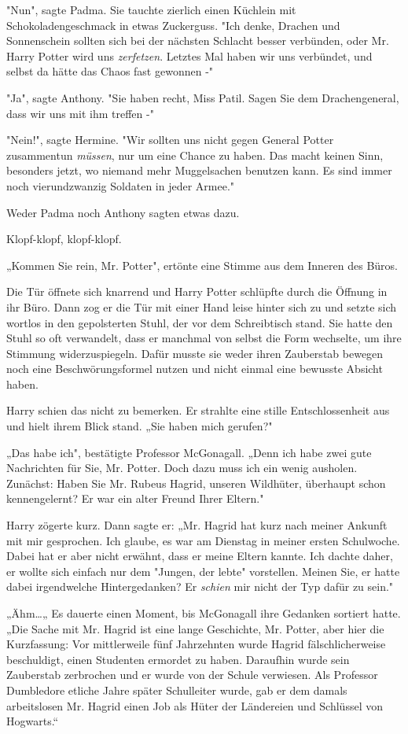 {"Nun", sagte Padma. Sie tauchte zierlich einen Küchlein mit Schokoladengeschmack in etwas Zuckerguss. "Ich denke, Drachen und Sonnenschein sollten sich bei der nächsten Schlacht besser verbünden, oder Mr. Harry Potter wird uns \emph{zerfetzen}. Letztes Mal haben wir uns verbündet, und selbst da hätte das Chaos fast gewonnen -"

"Ja", sagte Anthony. "Sie haben recht, Miss Patil. Sagen Sie dem Drachengeneral, dass wir uns mit ihm treffen -"

"Nein!", sagte Hermine. "Wir sollten uns nicht gegen General Potter zusammentun \emph{müssen}, nur um eine Chance zu haben. Das macht keinen Sinn, besonders jetzt, wo niemand mehr Muggelsachen benutzen kann. Es sind immer noch vierundzwanzig Soldaten in jeder Armee."

Weder Padma noch Anthony sagten etwas dazu.

Klopf-klopf, klopf-klopf.

„Kommen Sie rein, Mr. Potter", ertönte eine Stimme aus dem Inneren des Büros.

Die Tür öffnete sich knarrend und Harry Potter schlüpfte durch die Öffnung in ihr Büro. Dann zog er die Tür mit einer Hand leise hinter sich zu und setzte sich wortlos in den gepolsterten Stuhl, der vor dem Schreibtisch stand. Sie hatte den Stuhl so oft verwandelt, dass er manchmal von selbst die Form wechselte, um ihre Stimmung widerzuspiegeln. Dafür musste sie weder ihren Zauberstab bewegen noch eine Beschwörungsformel nutzen und nicht einmal eine bewusste Absicht haben.

Harry schien das nicht zu bemerken. Er strahlte eine stille Entschlossenheit aus und hielt ihrem Blick stand. „Sie haben mich gerufen?"

„Das habe ich", bestätigte Professor McGonagall. „Denn ich habe zwei gute Nachrichten für Sie, Mr. Potter. Doch dazu muss ich ein wenig ausholen. Zunächst: Haben Sie Mr. Rubeus Hagrid, unseren Wildhüter, überhaupt schon kennengelernt? Er war ein alter Freund Ihrer Eltern."

Harry zögerte kurz. Dann sagte er: „Mr. Hagrid hat kurz nach meiner Ankunft mit mir gesprochen. Ich glaube, es war am Dienstag in meiner ersten Schulwoche. Dabei hat er aber nicht erwähnt, dass er meine Eltern kannte. Ich dachte daher, er wollte sich einfach nur dem "Jungen, der lebte" vorstellen. Meinen Sie, er hatte dabei irgendwelche Hintergedanken? Er \emph{schien} mir nicht der Typ dafür zu sein."

„Ähm…„ Es dauerte einen Moment, bis McGonagall ihre Gedanken sortiert hatte. „Die Sache mit Mr. Hagrid ist eine lange Geschichte, Mr. Potter, aber hier die Kurzfassung: Vor mittlerweile fünf Jahrzehnten wurde Hagrid fälschlicherweise beschuldigt, einen Studenten ermordet zu haben. Daraufhin wurde sein Zauberstab zerbrochen und er wurde von der Schule verwiesen. Als Professor Dumbledore etliche Jahre später Schulleiter wurde, gab er dem damals arbeitslosen Mr. Hagrid einen Job als Hüter der Ländereien und Schlüssel von Hogwarts.“

}
